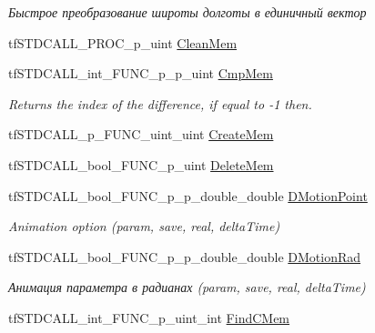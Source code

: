 \begin{DoxyCompactItemize}
\begin{DoxyCompactList}\small\item\em Быстрое преобразование широты долготы в единичный вектор \end{DoxyCompactList}\item 
tf\-S\-T\-D\-C\-A\-L\-L\-\_\-\-P\-R\-O\-C\-\_\-p\-\_\-uint \hyperlink{structs_functions_extension_c_p_u_a42ccd4a8b9229287d01320c8745e3d87}{Clean\-Mem}
\item 
\hypertarget{structs_functions_extension_c_p_u_ae6173644526079300fad0f7c2da5fe48}{tf\-S\-T\-D\-C\-A\-L\-L\-\_\-int\-\_\-\-F\-U\-N\-C\-\_\-p\-\_\-p\-\_\-uint \hyperlink{structs_functions_extension_c_p_u_ae6173644526079300fad0f7c2da5fe48}{Cmp\-Mem}}\label{structs_functions_extension_c_p_u_ae6173644526079300fad0f7c2da5fe48}

\begin{DoxyCompactList}\small\item\em Returns the index of the difference, if equal to -\/1 then. \end{DoxyCompactList}\item 
tf\-S\-T\-D\-C\-A\-L\-L\-\_\-p\-\_\-\-F\-U\-N\-C\-\_\-uint\-\_\-uint \hyperlink{structs_functions_extension_c_p_u_ac7091b06da7e6b3eca9876aec2a74db3}{Create\-Mem}
\item 
tf\-S\-T\-D\-C\-A\-L\-L\-\_\-bool\-\_\-\-F\-U\-N\-C\-\_\-p\-\_\-uint \hyperlink{structs_functions_extension_c_p_u_a759f2b1eb9ba156cb5106f50bcc3bb93}{Delete\-Mem}
\item 
\hypertarget{structs_functions_extension_c_p_u_a444b69d3707b8a68894451c354f4beaf}{tf\-S\-T\-D\-C\-A\-L\-L\-\_\-bool\-\_\-\-F\-U\-N\-C\-\_\-p\-\_\-p\-\_\-double\-\_\-double \hyperlink{structs_functions_extension_c_p_u_a444b69d3707b8a68894451c354f4beaf}{D\-Motion\-Point}}\label{structs_functions_extension_c_p_u_a444b69d3707b8a68894451c354f4beaf}

\begin{DoxyCompactList}\small\item\em Animation option (param, save, real, delta\-Time) \end{DoxyCompactList}\item 
\hypertarget{structs_functions_extension_c_p_u_ac5c87df08dbf916fb9f7563f4f1fea88}{tf\-S\-T\-D\-C\-A\-L\-L\-\_\-bool\-\_\-\-F\-U\-N\-C\-\_\-p\-\_\-p\-\_\-double\-\_\-double \hyperlink{structs_functions_extension_c_p_u_ac5c87df08dbf916fb9f7563f4f1fea88}{D\-Motion\-Rad}}\label{structs_functions_extension_c_p_u_ac5c87df08dbf916fb9f7563f4f1fea88}

\begin{DoxyCompactList}\small\item\em Анимация параметра в радианах (param, save, real, delta\-Time) \end{DoxyCompactList}\item 
\hypertarget{structs_functions_extension_c_p_u_aedf74a1ee61f956ced0dc3df423616a0}{tf\-S\-T\-D\-C\-A\-L\-L\-\_\-int\-\_\-\-F\-U\-N\-C\-\_\-p\-\_\-uint\-\_\-int \hyperlink{structs_functions_extension_c_p_u_aedf74a1ee61f956ced0dc3df423616a0}{Find\-C\-Mem}}\label{structs_functions_extension_c_p_u_aedf74a1ee61f956ced0dc3df423616a0}


\end{DoxyCompactItemize}
